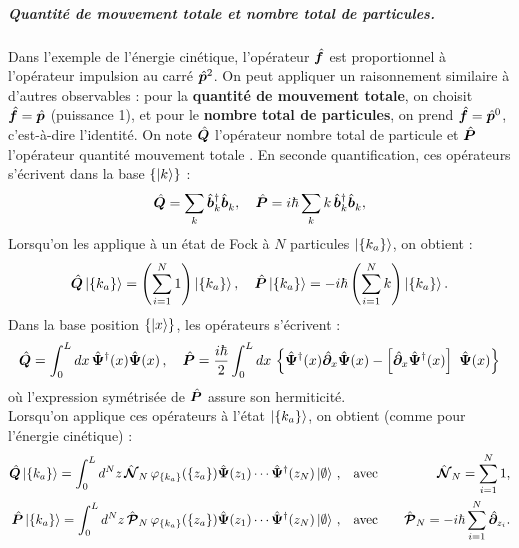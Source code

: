 \subparagraph{Quantité de mouvement totale et nombre total de particules.}
Dans l'exemple de l'énergie cinétique, l'opérateur  $\hat{\bm{f}}$ est proportionnel à l'opérateur impulsion au carré $\hat{\bm{p}}^2$. On peut appliquer un raisonnement similaire à d'autres observables : pour la {\bf quantité de mouvement totale}, on choisit $\hat{\bm{f}} = \hat{\bm{p}}$ (puissance 1), et pour le {\bf nombre total de particules}, on prend  $\hat{\bm{f}} = \hat{\bm{p}}^0$, c’est-à-dire l’identité. On note $\hat{\bm{Q}}$ l'opérateur nombre total de particule et $\hat{\bm{P}}$ l'opérateur quantité mouvement totale . En seconde quantification, ces opérateurs s'écrivent dans la base \( \{ \ket{k} \} \) : 
\begin{equation}
	\hat{\bm{Q}} = \sum_{k}  \hat{\bm{b}}^\dagger_k \hat{\bm{b}}_k^{} , \quad  \hat{\bm{P}} = i\hbar\sum_{k} k \, \hat{\bm{b}}^\dagger_k \hat{\bm{b}}_k^{},\label{eq.chap.1.Q.P.k.1}
\end{equation}
Lorsqu’on les applique à un état de Fock à $N$ particules \(\ket{\{k_a\}}\), on obtient :
\begin{eqnarray}
	\hat{\bm{Q}} \ket{\{k_a\}} = \left( \sum_{i = 1}^N 1 \right) \ket{\{k_a\}},\quad \hat{\bm{P}} \ket{\{k_a\}} = -i\hbar \left( \sum_{i = 1}^N k \right) \ket{\{k_a\}}.
\end{eqnarray}
Dans la base position \( \{ \ket{x} \} \), les opérateurs s’écrivent : 
\begin{eqnarray}
	\operator{Q}  =  \int_0^L dx \, \operator{\Psi}^\dag (x) \operator{\Psi} (x) \, , \quad 
	\operator{P}  =  \frac{i\hbar}2 \int_0^L dx \, \left \{  \operator{\Psi}^\dag(x) \operator{\partial}_x \operator{\Psi}(x) - \left [\operator{\partial}_x \operator{\Psi}^\dag(x)\right ] \operator{\Psi}(x)\right \} 
\end{eqnarray}
où l'expression symétrisée de $\hat{\bm{P}}$ assure son hermiticité.\\ 
Lorsqu'on applique ces opérateurs à l’état \(\ket{\{k_a\}}\), on obtient (comme pour l’énergie cinétique) :
\begin{eqnarray}
	\hat{\bm{Q}}\ket{ \{k_a\}} =  \int_0^L d^N z \, \hat{\bm{\mathcal{N}}}_N \, \varphi_{\{k_a\}}(\{z_a\} ) \hat{\bm{\Psi}}(z_1) \cdots \hat{\bm{\Psi}}^\dag(z_N) \ket{\emptyset}\, , \quad &\mbox{avec}& \quad \hat{\bm{\mathcal{N}}}_N = \sum_{i=1}^N 1,\\
	\hat{\bm{P}}\ket{ \{k_a\}} =  \int_0^L d^N z \, \hat{\bm{\mathcal{P}}}_N \, \varphi_{\{k_a\}}(\{z_a\} ) \hat{\bm{\Psi}}(z_1) \cdots \hat{\bm{\Psi}}^\dag(z_N) \ket{\emptyset}\, , \quad &\mbox{avec}& \quad \hat{\bm{\mathcal{P}}}_N = -i\hbar \sum_{i=1}^N \hat{\bm{\partial}}_{z_i}.
\end{eqnarray}

